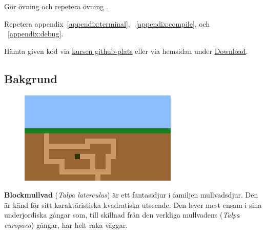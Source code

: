 
\Lab{\LabWeekFOUR}
\begin{Goals}

\end{Goals}

\begin{Preparations}
\item Gör övning \texttt{\ExeWeekFOUR} och repetera övning \texttt{\ExeWeekTHREE}.
\item Repetera appendix~\ref{appendix:terminal}, ~\ref{appendix:compile}, och ~\ref{appendix:debug}. 
\item Hämta given kod via \href{https://github.com/lunduniversity/introprog/tree/master/workspace/}{kursen github-plats} eller via hemsidan under \href{https://cs.lth.se/pgk/download/}{Download}.
\end{Preparations}



\subsection{Bakgrund}


\begin{minipage}{0.48\textwidth}
\begin{figure}[H]
  \centering
  \includegraphics[width=\textwidth]{../img/blockmole-sky-grass.png}
  \label{lab:blockmole:fig:mole}
\end{figure}
\end{minipage}%
%
\hfill\begin{minipage}{0.45\textwidth}
\noindent\textbf{Blockmullvad} (\textit{Talpa laterculus}) är ett fantasidjur i familjen mullvadsdjur.
Den är känd för sitt karaktäristiska kvadratiska utseende.
Den lever mest ensam i sina underjordiska gångar som, till skillnad från den verkliga mullvadens (\emph{Talpa europaea}) gångar, har helt raka väggar.
\end{minipage}




